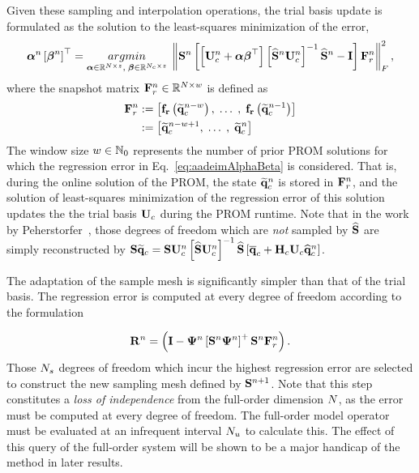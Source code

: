 Given these sampling and interpolation operations, the trial basis update is formulated as the solution to the least-squares minimization of the error,
%
\begin{equation}\label{eq:aadeimAlphaBeta}
	\adeimAlpha^{\timeIdx} \left[\adeimBeta^{\timeIdx}\right]^\top = \argmin{\adeimAlpha \inRTwo{\numDOF}{\numRank},\; \adeimBeta \inRTwo{\numConsModes}{\numRank}} \left\Vert \sampMat^{\timeIdx} \left[\left[\consTrial^{\timeIdx} + \adeimAlpha \adeimBeta^\top \right] \left[\sampMatInterp^{\timeIdx} \consTrial^{\timeIdx}\right]^{-1} \sampMatInterp^{\timeIdx} - \identMat \right] \resWindow^{\timeIdx} \right\Vert_F^2,
\end{equation}
%
where the snapshot matrix $\resWindow^{\timeIdx} \inRTwo{\numDOF}{\numWindow}$ is defined as
%
\begin{align}
	\resWindow^{\timeIdx} &\defEq \left[\rhsResFunc{\consVecRom^{\timeIdx - \numWindow}}, \; \hdots \;, \; \rhsResFunc{\consVecRom^{\timeIdx - 1}}\right] \\
	&\defEq \left[\consVecRom^{\timeIdx - \numWindow + 1}, \; \hdots \;, \; \consVecRom^{\timeIdx} \right]
\end{align}
%
The window size $w \in \mathbb{N}_0$ represents the number of prior PROM solutions for which the regression error in Eq.~\ref{eq:aadeimAlphaBeta} is considered. That is, during the online solution of the PROM, the state $\mathbf{\widetilde{q}}_{c}^{n}$ is stored in $\resWindow^{\timeIdx}$, and the solution of least-squares minimization of the regression error of this solution updates the the trial basis $\consTrial$ during the PROM runtime. Note that in the work by Peherstorfer~\cite{Peherstorfer2020Adaptive}, those degrees of freedom which are \textit{not} sampled by $\mathbf{\widehat{S}}$ are simply reconstructed by $\sampMat \consVecRom = \sampMat \consTrial^{\timeIdx} \left[\sampMatInterp \consTrial^{\timeIdx}\right]^{-1} \sampMatInterp \left[\consVecCent + \consScale \consTrial \consVecCoef^{\timeIdx}\right]$.

The adaptation of the sample mesh is significantly simpler than that of the trial basis. The regression error is computed at every degree of freedom according to the formulation

\begin{equation}
	\mathbf{R}^{\timeIdx} = \left(\identMat - \deimBasis^{\timeIdx} \left[\sampMat^{\timeIdx} \deimBasis^{\timeIdx}\right]^+ \sampMat^{\timeIdx} \resWindow^{\timeIdx}\right).
\end{equation}
Those $N_s$ degrees of freedom which incur the highest regression error are selected to construct the new sampling mesh defined by $\mathbf{S}^{n+1}$. Note that this step constitutes a \textit{loss of independence} from the full-order dimension $N$, as the error must be computed at every degree of freedom. The full-order model operator must be evaluated at an infrequent interval $N_u$ to calculate this. The effect of this query of the full-order system will be shown to be a major handicap of the method in later results.

